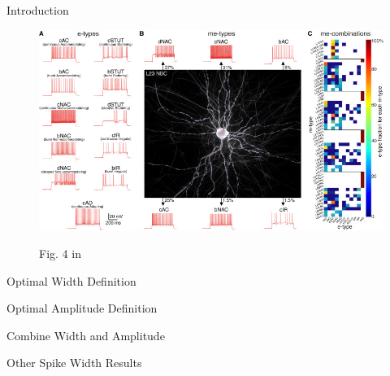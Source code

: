 \documentclass{beamer}
\begin{document}
\begin{frame}{Introduction}
    \begin{figure}
        \centering
        \includegraphics[width=\textwidth]{images/e-types.jpg}\\
        \caption*{\centering Fig. 4 in \textcite{markram_reconstruction_2015}}
    \end{figure}
\end{frame}

\begin{frame}{Optimal Width Definition}{}
\end{frame}

\begin{frame}{Optimal Amplitude Definition}
\end{frame}

\begin{frame}{Combine Width and Amplitude}
\end{frame}

\begin{frame}{Other Spike Width Results}
\end{frame}
\end{document}
